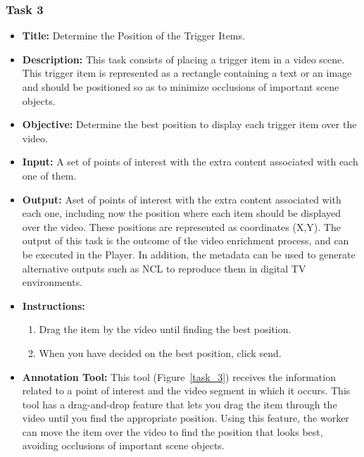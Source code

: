 \subsubsection{Task 3}

\begin{itemize}

\item \textbf{Title:} Determine the Position of the Trigger Items.

\item \textbf{Description:} This task consists of placing a trigger item in a video scene. This trigger item is represented as a rectangle containing a text or an image and should be positioned so as to minimize occlusions of important scene objects.

\item \textbf{Objective:} Determine the best position to display each trigger item over the video.


\item \textbf{Input:} A set of points of interest with the extra content associated with each one of them.

\item \textbf{Output:} Aset of points of interest with the extra content associated with each one, including now the position where each item should be displayed over the video. These positions are represented as coordinates (X,Y). The output of this task is the outcome of the video enrichment process, and can be executed in the Player. In addition, the metadata can be used to generate alternative outputs such as NCL to reproduce them in digital TV environments.


\item \textbf{Instructions:} \begin{enumerate}
	\item Drag the item by the video until finding the best position.
	\item When you have decided on the best position, click send.
\end{enumerate}

\pagebreak

\item \textbf{Annotation Tool:} This tool (Figure~\ref{task_3}) receives the information related to a point of interest and the video segment in which it occurs. This tool has a drag-and-drop feature that lets you drag the item through the video until you find the appropriate position. Using this feature, the worker can move the item over the video to find the position that looks best, avoiding occlusions of important scene objects.


\end{itemize}
